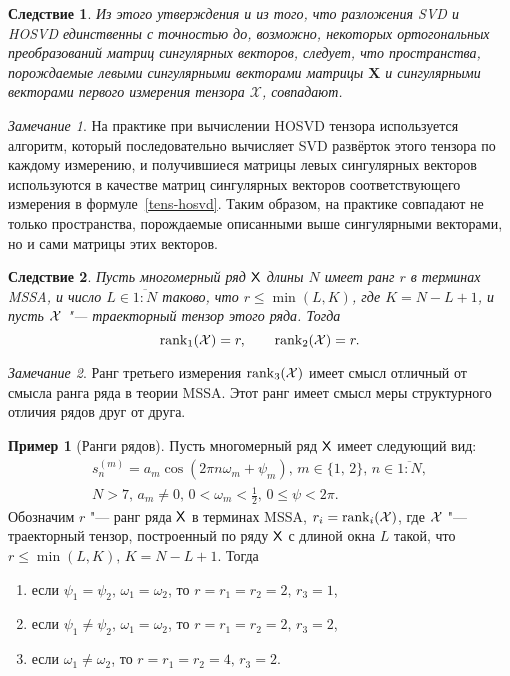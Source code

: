 \documentclass[11pt]{article}
\theoremstyle{plain}
\newtheorem{corollary}{Следствие}[statement]
\theoremstyle{definition}
\newtheorem{example}{Пример}[section]
\theoremstyle{remark}
\newtheorem*{remark}{Замечание}
\begin{document}
    \begin{corollary}
        Из этого утверждения и из того, что разложения \emph{SVD} и \emph{HOSVD} единственны с точностью до, возможно,
        некоторых ортогональных преобразований матриц сингулярных векторов, следует,
        что пространства, порождаемые левыми сингулярными векторами матрицы $\mathbf{X}$
        и сингулярными векторами первого измерения тензора $\mathcal{X}$, совпадают.
    \end{corollary}
    \begin{remark}
        На практике при вычислении HOSVD тензора используется алгоритм, который последовательно
        вычисляет SVD развёрток этого тензора по каждому измерению, и получившиеся матрицы левых сингулярных векторов
        используются в качестве матриц сингулярных векторов соответствующего измерения в формуле~\eqref{tens-hosvd}.
        Таким образом, на практике совпадают не только пространства, порождаемые описанными выше сингулярными векторами,
        но и сами матрицы этих векторов.
    \end{remark}

    \begin{corollary}
        Пусть многомерный ряд $\mathsf{X}$ длины $N$ имеет ранг $r$ в терминах \emph{MSSA}, и число $L \in \overline{1:N}$
        таково, что $r \leqslant \min(L, K)$, где $K = N - L + 1$, и пусть $\mathcal{X}$ "--- траекторный тензор этого ряда.
        Тогда
        \[
            \operatorname{rank}_1(\mathcal{X}) = r, \qquad \operatorname{rank}_2(\mathcal{X}) = r.
        \]
    \end{corollary}
    \begin{remark}
        Ранг третьего измерения $\operatorname{rank}_3(\mathcal{X})$ имеет смысл отличный от смысла ранга ряда
        в теории MSSA.
        Этот ранг имеет смысл меры структурного отличия рядов друг от друга.
    \end{remark}

    \begin{example}[Ранги рядов]
        Пусть многомерный ряд $\mathsf{X}$ имеет следующий вид:
        \begin{gather*}
            s_n^{(m)}=a_m \cos(2\pi n \omega_m + \psi_m),\, m \in \{1,\, 2\},\, n\in \overline{1:N},\\
            N > 7,\, a_m\ne 0,\, 0<\omega_m<\frac 1 2,\, 0 \leqslant \psi < 2 \pi.
        \end{gather*}
        Обозначим $r$ "--- ранг ряда $\mathsf{X}$ в терминах MSSA,
        $r_i = \operatorname{rank}_i(\mathcal{X})$, где $\mathcal{X}$ "--- траекторный тензор, построенный
        по ряду $\mathsf{X}$ с длиной окна $L$ такой, что $r \leqslant \min(L, K),\, K = N - L + 1$.
        Тогда
        \begin{enumerate}
            \item если $\psi_1 = \psi_2,\, \omega_1 = \omega_2$, то $r = r_1 = r_2 = 2,\, r_3 = 1$,
            \item если $\psi_1 \ne \psi_2,\, \omega_1 = \omega_2$, то $r = r_1 = r_2 = 2,\, r_3 = 2$,
            \item если $\omega_1 \ne \omega_2$, то $r = r_1 = r_2 = 4,\, r_3 = 2$.
        \end{enumerate}
    \end{example}
\end{document}
